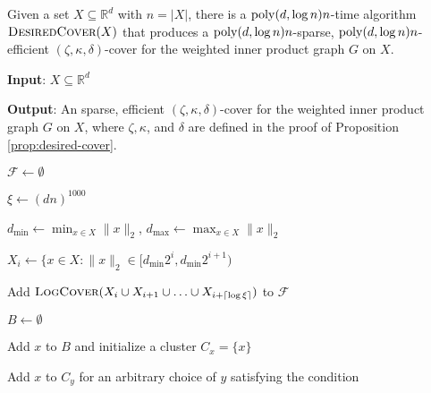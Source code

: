 \begin{proposition}\label{prop:desired-cover}
Given a set $X\subseteq \mathbb{R}^d$ with $n = |X|$, there is a $\mathrm{poly}(d,\log n) n$-time algorithm $\textsc{DesiredCover}(X)$ that produces a $\mathrm{poly}(d,\log n) n$-sparse, $\mathrm{poly}(d,\log n) n$-efficient $(\zeta,\kappa,\delta)$-cover for the weighted inner product graph $G$ on $X$.
\end{proposition}

\begin{algorithm}[!h]\caption{}
\begin{algorithmic}[1]

    \State \textbf{Input}: $X\subseteq \mathbb{R}^d$
    
    \State \textbf{Output}: An sparse, efficient $(\zeta,\kappa,\delta)$-cover for the weighted inner product graph $G$ on $X$, where $\zeta,\kappa$, and $\delta$ are defined in the proof of Proposition \ref{prop:desired-cover}.
    
    \State $\mathcal F\gets \emptyset$
    
    \State $\xi\gets (dn)^{1000}$
    
    \State $d_{\min}\gets \min_{x\in X} \|x\|_2$, $d_{\max}\gets \max_{x\in X} \|x\|_2$
    
    
    
        \State $X_i\gets \{x\in X: \|x\|_2\in [d_{\min}2^i,d_{\min}2^{i+1})$
        
        \State Add $\textsc{LogCover}(X_i\cup X_{i+1}\cup \hdots\cup X_{i+\lceil \log \xi \rceil})$ to $\mathcal F$
    
    \EndFor
    
    
    $B\gets \emptyset$
    
    
        
            \State Add $x$ to $B$ and initialize a cluster $C_x = \{x\}$
        
        \Else
        
            \State Add $x$ to $C_y$ for an arbitrary choice of $y$ satisfying the condition
        

\end{algorithmic}
\end{algorithm}
